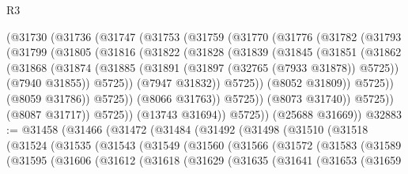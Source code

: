 \begin{lexlean}{R3}
\begin{coremodule}
            (@31730
              (@31736
                (@31747
                  (@31753
                    (@31759
                      (@31770
                        (@31776
                          (@31782
                            (@31793
                              (@31799
                                (@31805
                                  (@31816
                                    (@31822
                                      (@31828
                                        (@31839
                                          (@31845
                                            (@31851
                                              (@31862
                                                (@31868
                                                  (@31874
                                                    (@31885
                                                      (@31891
                                                        (@31897 (@32765 (@7933 @31878)) @5725))
                                                      (@7940 @31855))
                                                    @5725))
                                                (@7947 @31832))
                                              @5725))
                                          (@8052 @31809))
                                        @5725))
                                    (@8059 @31786))
                                  @5725))
                              (@8066 @31763))
                            @5725))
                        (@8073 @31740))
                      @5725))
                  (@8087 @31717))
                @5725))
            (@13743 @31694))
          @5725))
      (@25688 @31669))
@32883 := @31458
    (@31466
      (@31472
        (@31484
          (@31492
            (@31498
              (@31510
                (@31518
                  (@31524
                    (@31535
                      (@31543
                        (@31549
                          (@31560
                            (@31566
                              (@31572
                                (@31583
                                  (@31589
                                    (@31595
                                      (@31606
                                        (@31612
                                          (@31618
                                            (@31629
                                              (@31635
                                                (@31641
                                                  (@31653
                                                    (@31659

\end{coremodule}
\end{lexlean}
